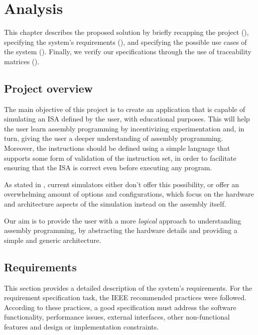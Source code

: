 \chapter{Analysis}\label{chap:analysis}
This chapter describes the proposed solution by briefly recapping the project (), specifying the system's requirements (), and specifying the possible use cases of the system (). Finally, we verify our specifications through the use of traceability matrices ().



\section{Project overview}\label{sec:project-description}
The main objective of this project is to create an application that is capable of simulating an \gls{ISA} defined by the user, with educational purposes. This will help the user learn \gls{assembly} programming by incentivizing experimentation and, in turn, giving the user a deeper understanding of \gls{assembly} programming. Moreover, the instructions should be defined using a simple language that supports some form of validation of the instruction set, in order to facilitate ensuring that the \gls{ISA} is correct even before executing any program.

As stated in , current simulators either don't offer this possibility, or offer an overwhelming amount of options and configurations, which focus on the hardware and architecture aspects of the simulation instead on the \gls{assembly} itself.

Our aim is to provide the user with a more \textit{logical} approach to understanding \gls{assembly} programming, by abstracting the hardware details and providing a simple and generic architecture.



\section{Requirements}\label{sec:requirements}
This section provides a detailed description of the system's requirements. For the requirement specification task, the IEEE recommended practices \parencite{IEEE830-1984} were followed. According to these practices, a good specification must address the software functionality, performance issues, external interfaces, other non-functional features and design or implementation constraints.

